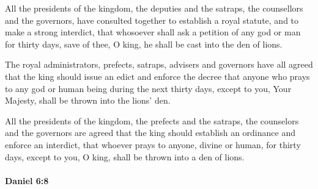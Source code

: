 			\begin{versebox}
					\item[BHS] 
					\item[LXX] 
					\item[ASV] All the presidents of the kingdom, the deputies and the satraps, the counsellors and the governors, have consulted together to establish a royal statute, and to make a strong interdict, that whosoever shall ask a petition of any god or man for thirty days, save of thee, O king, he shall be cast into the den of lions.
					\item[NIV] The royal administrators, prefects, satraps, advisers and governors have all agreed that the king should issue an edict and enforce the decree that anyone who prays to any god or human being during the next thirty days, except to you, Your Majesty, shall be thrown into the lions’ den.
					\item[NRSV] All the presidents of the kingdom, the prefects and the satraps, the counselors and the governors are agreed that the king should establish an ordinance and enforce an interdict, that whoever prays to anyone, divine or human, for thirty days, except to you, O king, shall be thrown into a den of lions.
			\end{versebox}

		\paragraph{Daniel 6:8} %
			\label{DANIEL-6-8}

